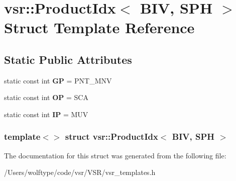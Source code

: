 \hypertarget{structvsr_1_1_product_idx_3_01_b_i_v_00_01_s_p_h_01_4}{\section{vsr\-:\-:Product\-Idx$<$ B\-I\-V, S\-P\-H $>$ Struct Template Reference}
\label{structvsr_1_1_product_idx_3_01_b_i_v_00_01_s_p_h_01_4}
}
\subsection*{Static Public Attributes}
\begin{DoxyCompactItemize}
\item 
\hypertarget{structvsr_1_1_product_idx_3_01_b_i_v_00_01_s_p_h_01_4_a3ff67caa46b8620d3ba19f14f788607a}{static const int {\bfseries G\-P} = P\-N\-T\-\_\-\-M\-N\-V}\label{structvsr_1_1_product_idx_3_01_b_i_v_00_01_s_p_h_01_4_a3ff67caa46b8620d3ba19f14f788607a}

\item 
\hypertarget{structvsr_1_1_product_idx_3_01_b_i_v_00_01_s_p_h_01_4_a45ba218a12c169566ae8988b998a1e87}{static const int {\bfseries O\-P} = S\-C\-A}\label{structvsr_1_1_product_idx_3_01_b_i_v_00_01_s_p_h_01_4_a45ba218a12c169566ae8988b998a1e87}

\item 
\hypertarget{structvsr_1_1_product_idx_3_01_b_i_v_00_01_s_p_h_01_4_a3df18192dfcc623c683442cca675c8e0}{static const int {\bfseries I\-P} = M\-U\-V}\label{structvsr_1_1_product_idx_3_01_b_i_v_00_01_s_p_h_01_4_a3df18192dfcc623c683442cca675c8e0}

\end{DoxyCompactItemize}
\subsubsection*{template$<$$>$ struct vsr\-::\-Product\-Idx$<$ B\-I\-V, S\-P\-H $>$}



The documentation for this struct was generated from the following file\-:\begin{DoxyCompactItemize}
\item 
/\-Users/wolftype/code/vsr/\-V\-S\-R/vsr\-\_\-templates.\-h\end{DoxyCompactItemize}
